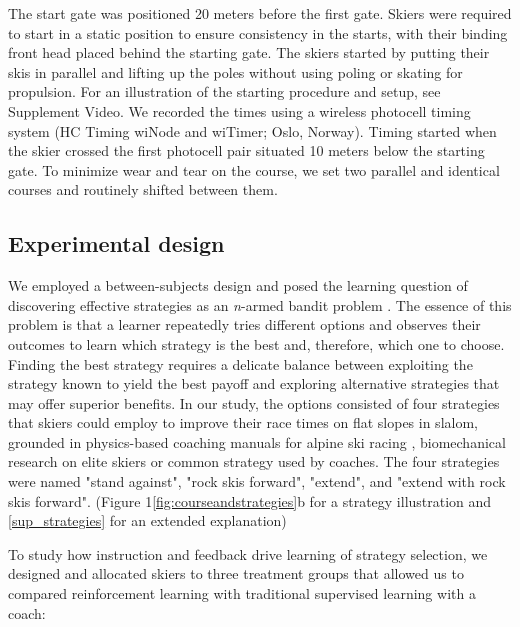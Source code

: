 \documentclass{article}
\begin{document}
 The start gate was positioned 20 meters before the first gate. Skiers were required to start in a static position to ensure consistency in the starts, with their binding front head placed behind the starting gate. The skiers started by putting their skis in parallel and lifting up the poles without using poling or skating for propulsion. For an illustration of the starting procedure and setup, see Supplement Video. We recorded the times using a wireless photocell timing system (HC Timing wiNode and wiTimer; Oslo, Norway). Timing started when the skier crossed the first photocell pair situated 10 meters below the starting gate. To minimize wear and tear on the course, we set two parallel and identical courses and routinely shifted between them.
 
\subsection{Experimental design}
We employed a between-subjects design and posed the learning question of discovering effective strategies as an \textit{n}-armed bandit problem \cite{sutton_reinforcement_2018}. The essence of this problem is that a learner repeatedly tries different options and observes their outcomes to learn which strategy is the best and, therefore, which one to choose. Finding the best strategy requires a delicate balance between exploiting the strategy known to yield the best payoff and exploring alternative strategies that may offer superior benefits. In our study, the options consisted of four strategies that skiers could employ to improve their race times on flat slopes in slalom, grounded in physics-based coaching manuals for alpine ski racing \cite{lemaster_skiers_1999, lemaster_ultimate_2010, lind_physics_2013}, biomechanical research on elite skiers \cite{reid_kinematic_2010, tjorhom_beskrivelse_2007, reid_alpine_2020, magelssen_is_2022}  or common strategy used by coaches. The four strategies were named "stand against", "rock skis forward", "extend", and "extend with rock skis forward". (Figure 1\ref{fig:courseandstrategies}b for a strategy illustration and \ref{sup_strategies} for an extended explanation)

To study how instruction and feedback drive learning of strategy selection, we designed and allocated skiers to three treatment groups that allowed us to compared reinforcement learning with traditional supervised learning with a coach:
\end{document}

